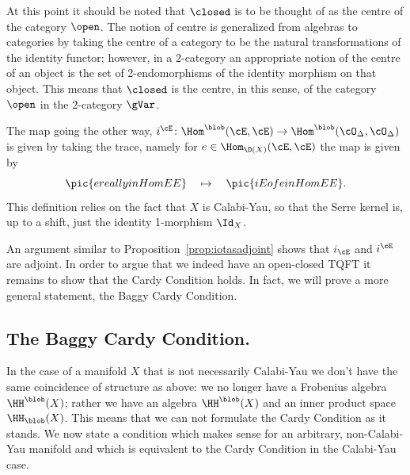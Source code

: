 At this point it should be noted that $\closed$ is to be thought of as the centre of the category $\open$.  The notion of centre is generalized from algebras to categories by taking the centre of a category to be the natural transformations of the identity functor; however, in a 2-category an appropriate notion of the centre of an object is the set of 2-endomorphisms of the identity morphism on that object.  This means that $\closed$ is the centre, in this sense, of the category $\open$ in the 2-category $\gVar$.

The map going the other way, $i^\cE\colon \Hom^\blob(\cE,\cE)\to
\Hom^\blob(\cO_\Delta,\cO_\Delta)$ is given by taking the trace, namely for
$e\in \Hom_{\D(X)}(\cE,\cE)$ the map is given by
\[\pic{ereallyinHomEE}\quad\mapsto \quad\pic{iEofeinHomEE}.\]
This definition relies on the fact that $X$ is Calabi-Yau, so that the
Serre kernel is, up to a shift, just the identity 1-morphism $\Id_X$.


%
%

An argument similar to Proposition~\ref{prop:iotasadjoint} shows that
$i_\cE$ and $i^\cE$ are adjoint.  In order to argue that we indeed
have an open-closed TQFT it remains to show that the Cardy Condition
holds.  In fact, we will prove a more general statement, the Baggy
Cardy Condition.

 \subsection{The Baggy Cardy Condition.}
In the case of a manifold $X$ that is not necessarily Calabi-Yau we
don't have the same coincidence of structure as above: we no longer
have a Frobenius algebra $\HH^\blob(X)$; rather we have an algebra
$\HH^\blob(X)$ and an inner product space $\HH_\blob(X)$.  This means
that we can not formulate the Cardy Condition as it stands.  We now state a
condition which makes sense for an arbitrary, non-Calabi-Yau manifold and
which is equivalent to the Cardy Condition in the  Calabi-Yau case.

